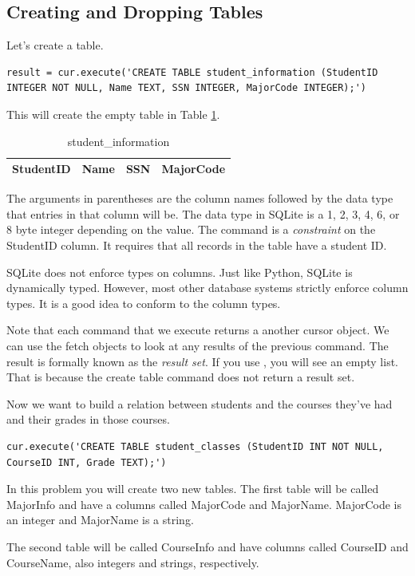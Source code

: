 \subsection*{Creating and Dropping Tables}
Let's create a table.
\begin{lstlisting}
result = cur.execute('CREATE TABLE student_information (StudentID INTEGER NOT NULL, Name TEXT, SSN INTEGER, MajorCode INTEGER);')
\end{lstlisting}
This will create the empty table in Table \ref{table:student_information}.
\begin{table}
\begin{tabular}{|l|l|l|l|}
\hline
StudentID & Name & SSN & MajorCode \\
\hline
\end{tabular}
\caption{student\_information}
\label{table:student_information}
\end{table}

The arguments in parentheses are the column names followed by the data type that entries in that column will be.  The  data type in SQLite is a 1, 2, 3, 4, 6, or 8 byte integer depending on the value.  The  command is a \emph{constraint} on the StudentID column.  It requires that all records in the table have a student ID.

\begin{info}
SQLite does not enforce types on columns.
Just like Python, SQLite is dynamically typed.
However, most other database systems strictly enforce column types.
It is a good idea to conform to the column types.
\end{info}


Note that each command that we execute returns a another cursor object.  We can use the fetch objects to look at any results of the previous command.  The result is formally known as the \emph{result set}.  If you use , you will see an empty list.  That is because the create table command does not return a result set.

Now we want to build a relation between students and the courses they've had and their grades in those courses.
\begin{lstlisting}
cur.execute('CREATE TABLE student_classes (StudentID INT NOT NULL, CourseID INT, Grade TEXT);')
\end{lstlisting}

\begin{problem}
In this problem you will create two new tables.  The first table will be called MajorInfo and have a columns called MajorCode and MajorName.  MajorCode is an integer and MajorName is a string.

The second table will be called CourseInfo and have columns called CourseID and CourseName, also integers and strings, respectively.
\label{prob:new_tables}
\end{problem}

